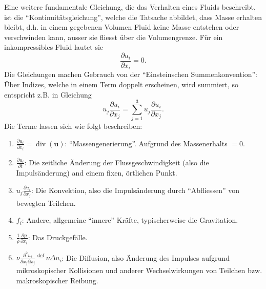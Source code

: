 Eine weitere fundamentale Gleichung, die das Verhalten eines Fluids beschreibt, ist die ``Kontinuitätsgleichung'',
welche die Tatsache abbildet, dass Masse erhalten bleibt, d.h. in einem gegebenen Volumen Fluid keine Masse
entstehen oder verschwinden kann, ausser sie fliesst über die Volumengrenze. Für ein inkompressibles Fluid lautet sie
%
\begin{equation}
    \label{reynolds:eqs:mass}
    \frac{\partial u_i}{\partial x_i} = 0.
\end{equation}
%
Die Gleichungen machen Gebrauch von der ``Einsteinschen Summenkonvention'': Über Indizes, welche in einem Term doppelt
erscheinen, wird summiert, so entspricht z.B. in Gleichung 
%
\begin{equation}
u_j \frac{\partial u_i}{\partial x_j} = \sum_{j=1}^{3} u_j \frac{\partial u_i}{\partial x_j}.
\end{equation}
%
Die Terme lassen sich wie folgt beschreiben:
%
\begin{enumerate}
    \item $\frac{\partial u_i}{\partial x_i} = \operatorname{div}(\mathbf{u})$: ``Massengenerierung''.
    Aufgrund des Massenerhalts $ = 0$.
    \item $\frac{\partial u_i}{\partial t}$: Die zeitliche Änderung der Flussgeschwindigkeit (also die 
        Impulsänderung) and einem fixen, örtlichen Punkt.
    \item $u_j \frac{\partial u_i}{\partial x_j}$: Die Konvektion, also die Impulsänderung durch ``Abfliessen''
        von bewegten Teilchen.
    \item $f_i$: Andere, allgemeine ``innere'' Kräfte, typischerweise die Gravitation.
    \item $\frac{1}{\rho} \frac{\partial p}{\partial x_i}$: Das Druckgefälle.
    \item $\nu \frac{\partial^2 u_i}{\partial x_j \partial x_j} \overset{\text{def}}{=} \nu \Delta u_i$: Die Diffusion, also Änderung des Impulses
        aufgrund mikroskopischer Kollisionen und anderer Wechselwirkungen von Teilchen bzw.
        makroskopischer Reibung.
\end{enumerate}
%
